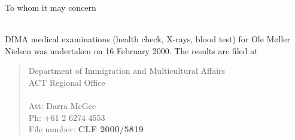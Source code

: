 \documentclass[12pt]{letter}
\begin{document}
\address{}


\begin{letter}{}



To whom it may concern \\ \\

\bigskip

\noindent DIMA medical examinations (health check, X-rays, blood test)
for Ole M{\o}ller Nielsen was undertaken on 16 February 2000. 
The results are filed at

\begin{quote}
  Department of Immigration and Multicultural Affairs \\
  ACT Regional Office \\
   \\
  Att: Darra McGee \\ 
  Ph: +61 2 6274 4553 \\
 
  File number: \textbf{CLF 2000/5819}
\end{quote}


\end{letter}
\end{document}
